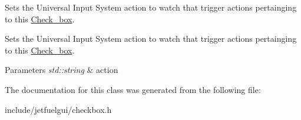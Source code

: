 Sets the Universal Input System action to watch that trigger actions pertainging to this \hyperlink{classjetfuel_1_1gui_1_1Check__box}{Check\+\_\+box}. 

Sets the Universal Input System action to watch that trigger actions pertainging to this \hyperlink{classjetfuel_1_1gui_1_1Check__box}{Check\+\_\+box}.


\begin{DoxyParams}{Parameters}
{\em std\+::string} & action \\
\hline
\end{DoxyParams}


The documentation for this class was generated from the following file\+:\begin{DoxyCompactItemize}
\item 
include/jetfuelgui/checkbox.\+h\end{DoxyCompactItemize}

